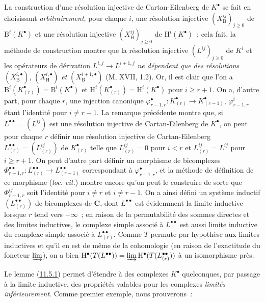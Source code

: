 La construction d'une résolution injective de Cartan-Eilenberg de $K^\bullet$
se fait en choisissant \emph{arbitrairement}, pour chaque $i$, une résolution
injective $(X_{\mathrm B}^{ij})_{j\geq0}$ de $\mathrm B^i(K^\bullet)$ et une
résolution injective $(X_{\mathrm H}^{ij})_{j\geq0}$ de
$\mathrm H^i(K^\bullet)$~; cela fait, la méthode de construction montre que
la résolution injective $(L^{ij})_{j\geq0}$ de $K^i$ et les opérateurs de
dérivation $L^{i,j}\to L^{i+1,j}$ \emph{ne dépendent que des résolutions}
$(X_{\mathrm B}^{i,\bullet})$, $(X_{\mathrm H}^{i,\bullet})$ \emph{et}
$(X_{\mathrm B}^{i+1,\bullet})$ (M, XVII, 1.2). Or, il est clair que l'on a
$\mathrm B^i(K_{(r)}^\bullet)=\mathrm B^i(K^\bullet)$ et
$\mathrm H^i(K_{(r)}^\bullet)=\mathrm H^i(K^\bullet)$ pour $i\geq r+1$. On
a, d'autre part, pour chaque $r$, une injection canonique
$\varphi_{r-1,r}^\bullet:K_{(r)}^\bullet\to K_{(r-1)}^\bullet$,
$\varphi_{r-1,r}^i$ étant l'identité pour $i\neq r-1$. La remarque précédente
montre que, si $L^{\bullet\bullet}=(L^{ij})$ est une résolution injective de
Cartan-Eilenberg de $K^\bullet$, on peut pour chaque $r$ définir une résolution
injective de Cartan-Eilenberg
$L_{(r)}^{\bullet\bullet}=(L_{(r)}^{ij})$ de $K_{(r)}^\bullet$ telle que
$L_{(r)}^{ij}=0$ pour $i<r$ et $L_{(r)}^{ij}=L^{ij}$ pour $i\geq r+1$. On peut
d'autre part définir un morphisme de bicomplexes
$\Phi_{r-1,r}^{\bullet\bullet}:L_{(r)}^{\bullet\bullet}\to
L_{(r-1)}^{\bullet\bullet}$ correspondant à $\varphi_{r-1,r}^\bullet$, et la
méthode de définition de ce morphisme (\emph{loc. cit.}) montre encore qu'on
peut le construire de sorte que $\Phi_{r-1,r}^{ij}$ soit l'identité pour
$i\neq r$ et $i\neq r-1$. On a ainsi défini un système inductif
$(L_{(r)}^{\bullet\bullet})$ de bicomplexes de $\boldsymbol{C}$, dont
$L^{\bullet\bullet}$ est évidemment la limite inductive lorsque $r$ tend vers
$-\infty$~; en raison de la permutabilité des sommes directes et des limites
inductives, le complexe simple associé à $L^{\bullet\bullet}$ est aussi limite
inductive du complexe simple associé à $L_{(r)}^{\bullet\bullet}$. Comme $T$
permute par hypothèse aux limites inductives et qu'il en est de même de la
cohomologie (en raison de l'exactitude du foncteur $\varinjlim$), on a bien
$\mathrm H^\bullet(T(L^{\bullet\bullet}))=\varinjlim\mathrm H^\bullet(T(L_{(r)}^{\bullet\bullet}))$
à un isomorphisme près.

Le lemme (\hyperref[0.11.5.1-fr]{11.5.1}) permet d'étendre à des complexes
$K^\bullet$ quelconques, par passage à la limite inductive, des propriétés
valables pour les complexes \emph{limités inférieurement}. Comme premier
exemple, nous prouverons~:

